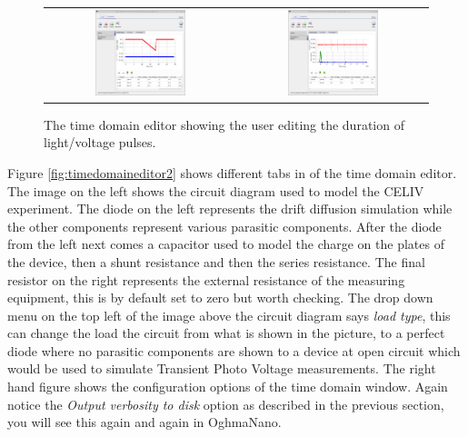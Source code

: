 \begin{figure}[H]
\centering
\begin{tabular}{ c c }

\includegraphics[width=0.5\textwidth,height=0.4\textwidth]{./images/time_domain_editor.png}

&
\includegraphics[width=0.5\textwidth,height=0.4\textwidth]{./images/time_domain_editor2.png}

\\

\end{tabular}
\caption{The time domain editor showing the user editing the duration of light/voltage pulses.}
\label{fig:timedomaineditor}
\end{figure}

Figure \ref{fig:timedomaineditor2} shows different tabs in of the time domain editor. The image on the left shows the circuit diagram used to model the CELIV experiment. The diode on the left represents the drift diffusion simulation while the other components represent various parasitic components.  After the diode from the left next comes a capacitor used to model the charge on the plates of the device, then a shunt resistance and then the series resistance.  The final resistor on the right represents the external resistance of the measuring equipment, this is by default set to zero but worth checking. The drop down menu on the top left of the image above the circuit diagram says \emph{load type}, this can change the load the circuit from what is shown in the picture, to a perfect diode where no parasitic components are shown to a device at open circuit which would be used to simulate Transient Photo Voltage measurements.  The right hand figure shows the configuration options of the time domain window. Again notice the \emph{Output verbosity to disk} option as described in the previous section, you will see this again and again in OghmaNano.

